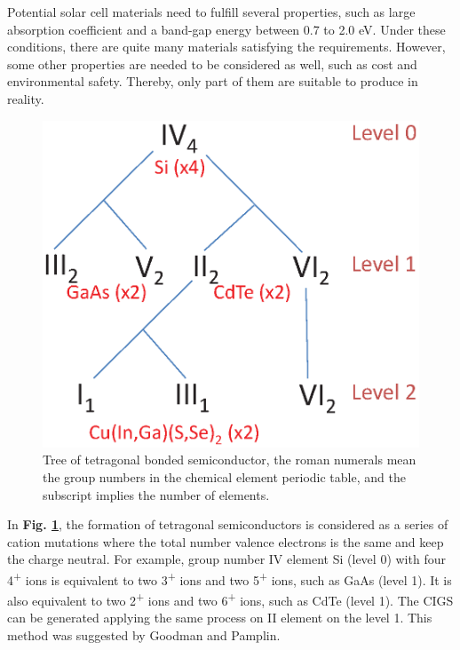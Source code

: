 \documentclass[a4paper, 12pt, titlepage,oneside,drop]{kthesis}
\begin{document}
Potential solar cell materials need to fulfill several properties, such as large absorption coefficient and a band-gap energy between 0.7 to 2.0 eV. Under these conditions, there are quite many materials satisfying the 
requirements. However, some other properties are needed to be considered as well, such as cost and environmental safety. Thereby, only part of them are suitable to produce in reality.

\begin{figure}[H]
\centering
\includegraphics[scale=0.5]{tree.eps} 
\caption{Tree of tetragonal bonded semiconductor, the roman numerals mean the group numbers in the chemical element periodic table, and the subscript implies the number of elements.}
\label{lscm}
\end{figure}

In \textbf{Fig. \ref{lscm}}, the formation of tetragonal semiconductors is considered as a series of cation mutations where the total number valence electrons is the same and keep the charge neutral. For example, group number
IV element Si (level 0) with four 4\textsuperscript{+} ions is equivalent to two 3\textsuperscript{+} ions and two 5\textsuperscript{+} ions, such as GaAs (level 1). It is also equivalent to two 2\textsuperscript{+} ions
and two 6\textsuperscript{+} ions, such as CdTe (level 1). The CIGS can be generated applying the same process on II element on the level 1. This method was suggested by Goodman and Pamplin. 
\end{document}
